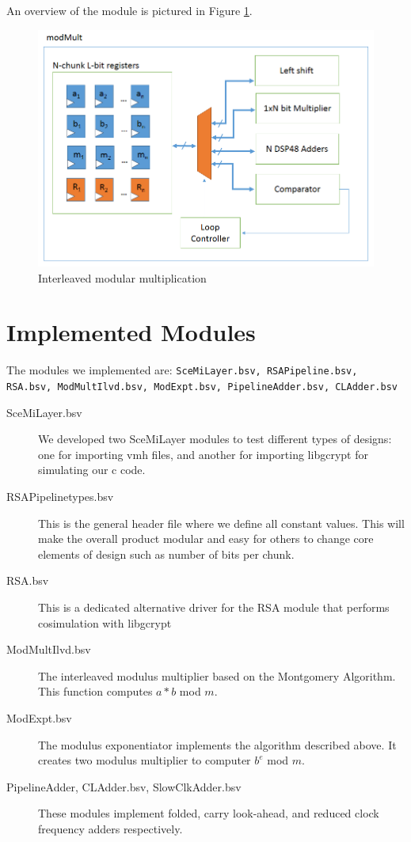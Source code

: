 \documentclass[a4paper,11pt]{report}
\begin{document}
An overview of the module is pictured in Figure \ref{fig-inter}.

\begin{figure}
  \begin{centering}
    \includegraphics[width=\textwidth]{modmult.png}
    \caption{Interleaved modular multiplication}
    \label{fig-inter}
  \end{centering}
\end{figure}
\section{Implemented Modules}
The modules we implemented are:  {\tt SceMiLayer.bsv, RSAPipeline.bsv, RSA.bsv, ModMultIlvd.bsv, ModExpt.bsv, PipelineAdder.bsv, CLAdder.bsv}

\begin{description}
  \item[SceMiLayer.bsv] We developed two SceMiLayer modules to test different types of designs: one for importing vmh files, and another for importing libgcrypt for simulating our c code.  

  \item[RSAPipelinetypes.bsv] This is the general header file where we define all constant values.  This will make the overall product modular and easy for others to change core elements of design such as number of bits per chunk.
  \item[RSA.bsv]This is a dedicated alternative driver for the RSA module that performs cosimulation with libgcrypt
  \item[ModMultIlvd.bsv] The interleaved modulus multiplier based on the Montgomery Algorithm.  This function computes $a*b$ mod $m$.
  \item[ModExpt.bsv] The modulus exponentiator implements the algorithm described above.  It creates two modulus multiplier to computer $b^e$ mod $m$.
  \item[PipelineAdder, CLAdder.bsv, SlowClkAdder.bsv] These modules implement folded, carry look-ahead, and reduced clock frequency adders respectively. 
\end{description}
\end{document}
